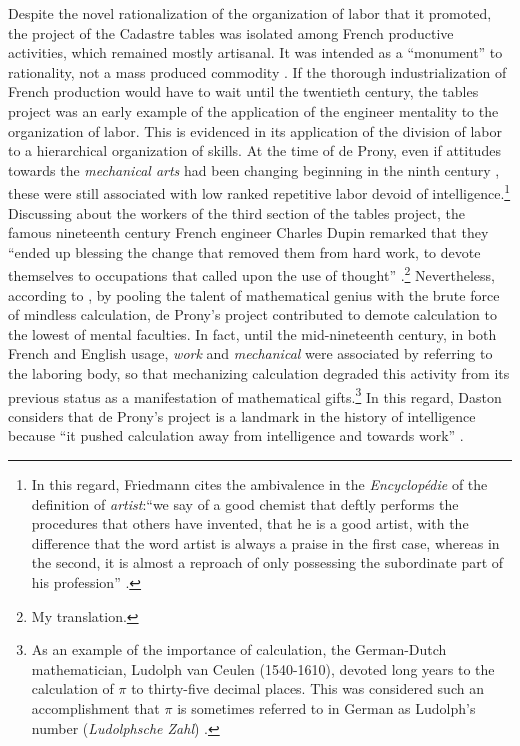 \documentclass[version=last,draft=false,paper=A4,portrait,twoside=true,twocolumn=false,headinclude=false,footinclude=false,fontsize=12,BCOR=20mm,DIV=calc,pagesize=auto,titlepage=firstiscover,mpinclude=false,open=right,chapterprefix=true,numbers=autoendperiod,headsepline=false,headings=twolinechapter,parskip=false]{scrbook}
\begin{document}
Despite the novel rationalization of the organization of labor that it
promoted, the project of the Cadastre tables was isolated among French
productive activities, which remained mostly artisanal. It was intended as
a ``monument'' to rationality, not a mass produced commodity
\autocite[57]{prony1804}. If the thorough industrialization of French
production would have to wait until the twentieth century, the tables
project was an early example of the application of the engineer mentality
to the organization of labor. This is evidenced in its application of the
division of labor to a hierarchical organization of skills. At the time of
de Prony, even if attitudes towards the \emph{mechanical arts} had been changing
beginning in the ninth century \autocite[10]{vatin_pillon2003_2007},
these were still associated with low ranked repetitive labor devoid of
intelligence.\footnote{In this regard, Friedmann cites the ambivalence in the \emph{Encyclopédie}
of the definition of \emph{artist}:``we say of a good chemist that deftly
performs the procedures that others have invented, that he is a good
artist, with the difference that the word artist is always a praise in the
first case, whereas in the second, it is almost a reproach of only
possessing the subordinate part of his profession''
\autocite[my translation, footnote 1, p. 55]{friedmann1953}.} Discussing about the workers of the third section of
the tables project, the famous nineteenth century French engineer Charles
Dupin remarked that they ``ended up blessing the change that removed them
from hard work, to devote themselves to occupations that called upon the
use of thought'' \autocite[211]{dupin1824}.\footnote{My translation.} Nevertheless,
according to \textcite{daston1994}, by pooling the talent of mathematical
genius with the brute force of mindless calculation, de Prony's project
contributed to demote calculation to the lowest of mental faculties. In
fact, until the mid-nineteenth century, in both French and English usage,
\emph{work} and \emph{mechanical} were associated by referring to the laboring body, so
that mechanizing calculation degraded this activity from its previous
status as a manifestation of mathematical gifts.\footnote{As an example of the importance of calculation, the German-Dutch
mathematician, Ludolph van Ceulen (1540-1610), devoted long years to the
calculation of \(\pi\) to thirty-five decimal places. This was considered such an
accomplishment that \(\pi\) is sometimes referred to in German as Ludolph's
number (\emph{Ludolphsche Zahl}) \autocite[50]{maor1994}.} In this regard,
Daston considers that de Prony's project is a landmark in the history of
intelligence because ``it pushed calculation away from intelligence and
towards work'' \autocite[190]{daston1994}.
\end{document}
